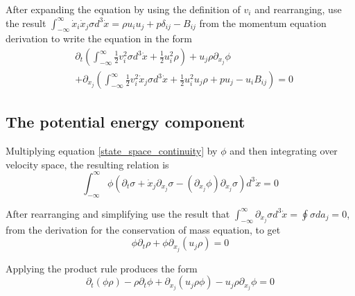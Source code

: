 \documentclass[%
 reprint,
 amsmath,amssymb,
 aps,
]{revtex4-1}
\newcommand{\intVdot}[1]{\int_{-\infty}^{\infty} #1 d^3\dot{x}}
\begin{document}
After expanding the equation by using the definition of $v_i$ and rearranging, use the result $\intVdot{\dot{x}_i\dot{x}_j\sigma}=\rho u_i u_j + p\delta_{ij} - B_{ij}$ from the momentum equation derivation to write the equation in the form
\begin{equation}
\begin{split}
& \partial_t\left(\intVdot{\frac{1}{2}v_i^2\sigma} + \frac{1}{2}u_i^2\rho\right) + u_j\rho\partial_{x_j}\phi \\ & + \partial_{x_j}\left(\intVdot{\frac{1}{2}v_i^2\dot{x}_j\sigma} + \frac{1}{2}u_i^2 u_j\rho + p u_j - u_i B_{ij}\right)=0
\end{split}
\label{incomplete_conservation_of_energy_kinetic}
\end{equation}

\subsection{The potential energy component}
Multiplying equation \eqref{state_space_continuity} by $\phi$ and then integrating over velocity space, the resulting relation is
\[
\intVdot{\phi\left(\partial_t \sigma + \dot{x}_j\partial_{x_j}\sigma-\left(\partial_{x_j}\phi\right)\partial_{\dot{x}_j}\sigma\right)}=0
\]

After rearranging and simplifying use the result that $\intVdot{\partial_{\dot{x}_j}\sigma}=\oint\sigma da_j = 0$, from the derivation for the conservation of mass equation, to get
\[
\phi\partial_t\rho + \phi\partial_{x_j}\left(u_j\rho\right)=0
\]

Applying the product rule produces the form
\begin{equation}
\partial_t\left(\phi\rho\right) - \rho\partial_t\phi + \partial_{x_j}\left(u_j\rho\phi\right) - u_j\rho\partial_{x_j}\phi=0
\label{incomplete_conservation_of_energy_potential}
\end{equation}
\end{document}
